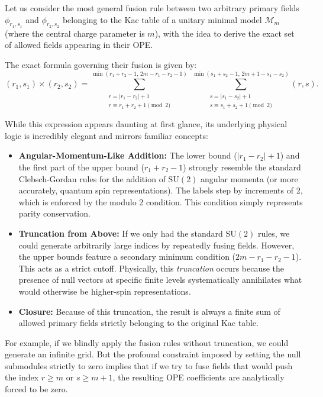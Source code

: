 Let us consider the most general fusion rule between two arbitrary primary fields \(\phi_{r_1, s_1}\) and \(\phi_{r_2, s_2}\) belonging to the Kac table of a unitary minimal model \(\mathcal{M}_m\) (where the central charge parameter is \(m\)), with the idea to derive the exact set of allowed fields appearing in their OPE.

The exact formula governing their fusion is given by:
\[
    (r_1, s_1) \times (r_2, s_2) = \sum_{\substack{r = |r_1 - r_2| + 1 \\ r \equiv r_1 + r_2 + 1 \pmod 2}}^{\min(r_1 + r_2 - 1,\, 2m - r_1 - r_2 - 1)} \; \sum_{\substack{s = |s_1 - s_2| + 1 \\ s \equiv s_1 + s_2 + 1 \pmod 2}}^{\min(s_1 + s_2 - 1,\, 2m + 1 - s_1 - s_2)} (r, s).
\]

While this expression appears daunting at first glance, its underlying physical logic is incredibly elegant and mirrors familiar concepts:
\begin{itemize}
    \item \textbf{Angular-Momentum-Like Addition:} The lower bound (\(|r_1 - r_2| + 1\)) and the first part of the upper bound (\(r_1 + r_2 - 1\)) strongly resemble the standard Clebsch-Gordan rules for the addition of \(\mathrm{SU}(2)\) angular momenta (or more accurately, quantum spin representations). The labels step by increments of 2, which is enforced by the modulo 2 condition. This condition simply represents parity conservation.
    \item \textbf{Truncation from Above:} If we only had the standard \(\mathrm{SU}(2)\) rules, we could generate arbitrarily large indices by repeatedly fusing fields. However, the upper bounds feature a secondary minimum condition (\(2m - r_1 - r_2 - 1\)). This acts as a strict cutoff. Physically, this \textit{truncation} occurs because the presence of null vectors at specific finite levels systematically annihilates what would otherwise be higher-spin representations.
    \item \textbf{Closure:} Because of this truncation, the result is always a finite sum of allowed primary fields strictly belonging to the original Kac table.
\end{itemize}

For example, if we blindly apply the fusion rules without truncation, we could generate an infinite grid. But the profound constraint imposed by setting the null submodules strictly to zero implies that if we try to fuse fields that would push the index \(r \ge m\) or \(s \ge m+1\), the resulting OPE coefficients are analytically forced to be zero.

